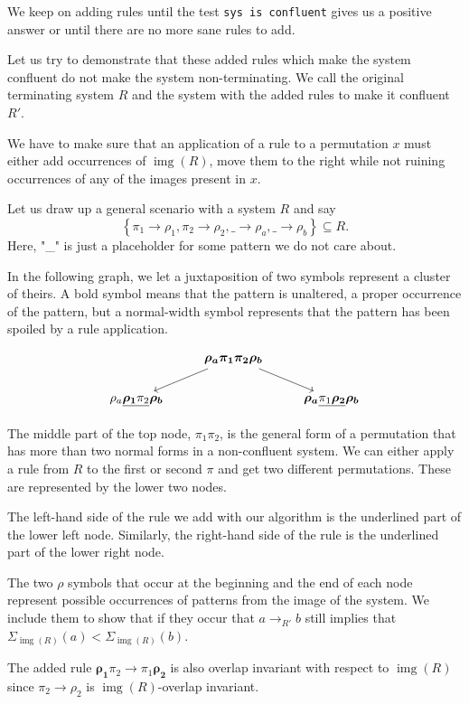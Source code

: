 \documentclass[a4paper, 11pt, english]{article}
\newcommand{\patternrule}{ \to \!}
\theoremstyle{definition}
\DeclareMathOperator{\img}{img}
\begin{document}
We keep on adding rules until the test \verb|sys is confluent| gives us a positive answer
or until there are no more sane rules to add.

Let us try to demonstrate that these added rules which make the system confluent do
not make the system non-terminating.
We call the original terminating system $R$ and the system with the added rules to make it confluent
$R'$.
 
We have to make sure that an application of a rule to a permutation $x$ must either add occurrences of $\img(R)$, move them
to the right while not ruining occurrences of any of the images present in $x$.

Let us draw up a general scenario with a system $R$ and say 
\[
  \left\{ \pi_1 \patternrule \rho_1, \pi_2 \patternrule \rho_2, 
  \_ \patternrule \rho_a, \_ \patternrule \rho_b \right\} \subseteq R.
\]
Here, "\_" is just a placeholder for some pattern we do not care about.

In the following graph, we let a juxtaposition of two symbols represent a cluster of theirs. A bold
symbol means that the pattern is unaltered, a proper occurrence of the pattern, but a normal-width
symbol represents that the pattern has been spoiled by a rule application.

\[
\begin{tikzcd}  
    & \bm{\rho_a \pi_1 \pi_2 \rho_b} \arrow[dl] \arrow[dr] & \\
    \rho_a \underline{\bm{\rho_1}\pi_2}\bm{\rho_b} & & \bm{\rho_a}\underline{\pi_1 \bm{\rho_2}} \bm{\rho_b}
\end{tikzcd}
\]

The middle part of the top node, $\pi_1\pi_2$, is the general form of a permutation that has more than two normal forms in
a non-confluent system. We can either apply a rule from $R$ to the first or second $\pi$ and get two different
permutations. These are represented by the lower two nodes.

The left-hand side of the rule we add with our algorithm is the underlined part of the lower left
node. Similarly, the right-hand side of the rule is the underlined part of the lower right node.

The two $\rho$ symbols that occur at the beginning and the end of each node represent possible
occurrences of patterns from the image of the system. We include them to show that if they occur
that $a \to_{R'} b$ still implies that $\Sigma_{\img(R)}(a) < \Sigma_{\img(R)}(b)$.

The added rule $\bm{\rho_1} \pi_2 \patternrule \pi_1 \bm{\rho_2}$ is also
overlap invariant with respect to $\img(R)$ since $\pi_2 \patternrule \rho_2$ is $\img(R)$-overlap invariant.
\end{document}
